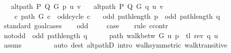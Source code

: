 \begin{isabellebody}
\ \ \ {\isachardoublequoteopen}alt{\isacharunderscore}{\kern0pt}path\ P\ Q\ G\ p\ u\ v{\isachardoublequoteclose}\isanewline
\ \ \ {\isachardoublequoteopen}alt{\isacharunderscore}{\kern0pt}path\ P\ Q\ G\ q\ u\ v{\isachardoublequoteclose}\isanewline
\ \ \ {\isachardoublequoteopen}{\isasymnot}\ {\isacharparenleft}{\kern0pt}{\isasymexists}c{\isachardot}{\kern0pt}\ path\ G\ c\ {\isasymand}\ odd{\isacharunderscore}{\kern0pt}cycle\ c{\isacharparenright}{\kern0pt}{\isachardoublequoteclose}\isanewline
\ \ \ {\isachardoublequoteopen}odd\ {\isacharparenleft}{\kern0pt}path{\isacharunderscore}{\kern0pt}length\ p{\isacharparenright}{\kern0pt}\ {\isacharequal}{\kern0pt}\ odd\ {\isacharparenleft}{\kern0pt}path{\isacharunderscore}{\kern0pt}length\ q{\isacharparenright}{\kern0pt}{\isachardoublequoteclose}\isanewline
%
\isadelimproof
%
\endisadelimproof
%
\isatagproof
{}\isamarkupfalse%
\ {\isacharparenleft}{\kern0pt}standard{\isacharcomma}{\kern0pt}\ goal{\isacharunderscore}{\kern0pt}cases{\isacharparenright}{\kern0pt}\isanewline
\ \ \isamarkupfalse%
\ odd{\isacharcolon}{\kern0pt}\ {}\isanewline
\ \ \isamarkupfalse%
\ {\isacharquery}{\kern0pt}case\isanewline
\ \ \isamarkupfalse%
\ {\isacharparenleft}{\kern0pt}rule\ ccontr{\isacharparenright}{\kern0pt}\isanewline
\ \ \ \ \isamarkupfalse%
\ not{\isacharunderscore}{\kern0pt}odd{\isacharcolon}{\kern0pt}\ {\isachardoublequoteopen}{\isasymnot}\ odd\ {\isacharparenleft}{\kern0pt}path{\isacharunderscore}{\kern0pt}length\ q{\isacharparenright}{\kern0pt}{\isachardoublequoteclose}\isanewline
\ \ \ \ \isamarkupfalse%
\ path{\isacharcolon}{\kern0pt}\ {\isachardoublequoteopen}walk{\isacharunderscore}{\kern0pt}betw\ G\ u\ {\isacharparenleft}{\kern0pt}p\ {\isacharat}{\kern0pt}\ tl\ {\isacharparenleft}{\kern0pt}rev\ q{\isacharparenright}{\kern0pt}{\isacharparenright}{\kern0pt}\ u{\isachardoublequoteclose}\isanewline
\ \ \ \ \ \ \isamarkupfalse%
\ assms{\isacharparenleft}{\kern0pt}{}{\isacharcomma}{\kern0pt}\ {}{\isacharparenright}{\kern0pt}\isanewline
\ \ \ \ \ \ \isamarkupfalse%
\ {\isacharparenleft}{\kern0pt}auto\ dest{\isacharcolon}{\kern0pt}\ alt{\isacharunderscore}{\kern0pt}pathD{\isacharparenleft}{\kern0pt}{}{\isacharparenright}{\kern0pt}\ intro{\isacharcolon}{\kern0pt}\ walk{\isacharunderscore}{\kern0pt}symmetric\ walk{\isacharunderscore}{\kern0pt}transitive{\isacharparenright}{\kern0pt}\isanewline

\end{isabellebody}
